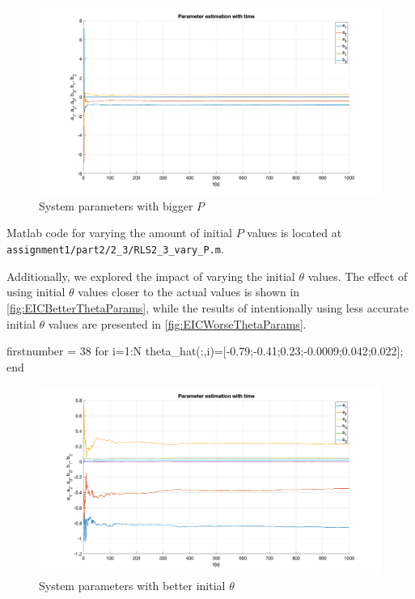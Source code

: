 \begin{figure}
	\centering
	\includegraphics[totalheight=8cm]{images/EICBiggerPParams.png}
	\caption{System parameters with bigger $P$}
	\label{fig:EICBiggerPParams}
\end{figure}

Matlab code for varying the amount of initial $P$ values is located at   \hspace{-1ex}\lstinline| assignment1/part2/2_3/RLS2_3_vary_P.m|.


Additionally, we explored the impact of varying the initial $\theta$ values. The effect of using initial $\theta$ values closer to the actual values is shown in \autoref{fig:EICBetterThetaParams}, while the results of intentionally using less accurate initial $\theta$ values are presented in \autoref{fig:EICWorseThetaParams}.

\begin{code}
	\begin{matlabcode}{firstnumber = 38}
for i=1:N
theta_hat(:,i)=[-0.79;-0.41;0.23;-0.0009;0.042;0.022]; %
end
	\end{matlabcode}
	\label{code:EICTheta}
\end{code}

\begin{figure}
	\centering
	\includegraphics[totalheight=8cm]{images/EICBetterThetaParams.png}
	\caption{System parameters with better initial $\theta$}
	\label{fig:EICBetterThetaParams}
\end{figure}


